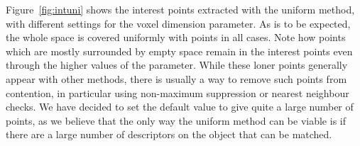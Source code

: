 \documentclass[11pt,a4paper]{kth-mag}
\begin{document}
Figure~\ref{fig:intuni} shows the interest points extracted with the uniform
method, with different settings for the voxel dimension parameter. As is to be
expected, the whole space is covered uniformly with points in all cases. Note
how points which are mostly surrounded by empty space remain in the interest
points even through the higher values of the parameter. While these loner points
generally appear with other methods, there is usually a way to remove such
points from contention, in particular using non-maximum suppression or nearest
neighbour checks. We have decided to set the default value to give quite a large
number of points, as we believe that the only way the uniform method can be
viable is if there are a large number of descriptors on the object that can be
matched.

\begin{figure}
  \centering
  \centerline{
    \\
}
\end{figure}
\end{document}
